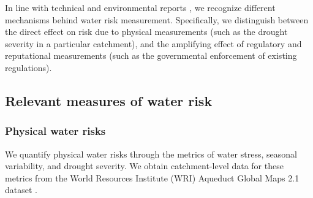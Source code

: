 \documentclass[a4paper]{article}
\begin{document}
In line with technical and environmental reports \citep[see e.g.,][]{Reig:2013, Orr:2011}, we recognize different mechanisms behind water risk measurement. 
Specifically, we distinguish between the direct effect on risk due to physical measurements (such as the drought severity in a particular catchment), and the amplifying effect of regulatory and reputational measurements (such as the governmental enforcement of existing regulations).



\subsection{Relevant measures of water risk} \label{sec:metrics}

\subsubsection{Physical water risks}
We quantify physical water risks through the metrics of water stress, seasonal variability, and drought severity.
We obtain catchment-level data for these metrics from the World Resources Institute (WRI) Aqueduct Global Maps 2.1 dataset \citep{Gassert:2014}.

\end{document}
